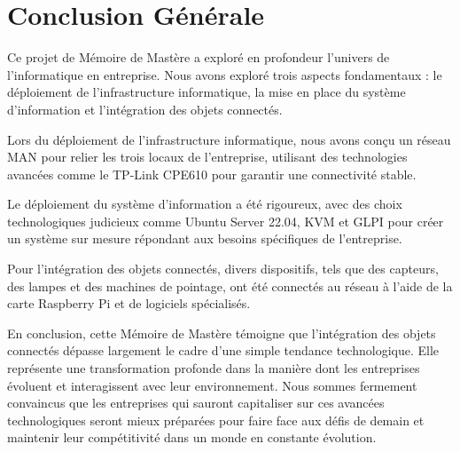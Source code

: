 \chapter*{Conclusion Générale}

Ce projet de Mémoire de Mastère a exploré en profondeur l'univers de l'informatique en entreprise. Nous avons exploré trois aspects fondamentaux : le déploiement de l'infrastructure informatique, la mise en place du système d'information et l'intégration des objets connectés.

Lors du déploiement de l'infrastructure informatique, nous avons conçu un réseau MAN pour relier les trois locaux de l'entreprise, utilisant des technologies avancées comme le TP-Link CPE610 pour garantir une connectivité stable.

Le déploiement du système d'information a été rigoureux, avec des choix technologiques judicieux comme Ubuntu Server 22.04, KVM et GLPI pour créer un système sur mesure répondant aux besoins spécifiques de l'entreprise.

Pour l'intégration des objets connectés, divers dispositifs, tels que des capteurs, des lampes et des machines de pointage, ont été connectés au réseau à l'aide de la carte Raspberry Pi et de logiciels spécialisés.

En conclusion, cette Mémoire de Mastère témoigne que l'intégration des objets connectés dépasse largement le cadre d'une simple tendance technologique. Elle représente une transformation profonde dans la manière dont les entreprises évoluent et interagissent avec leur environnement. Nous sommes fermement convaincus que les entreprises qui sauront capitaliser sur ces avancées technologiques seront mieux préparées pour faire face aux défis de demain et maintenir leur compétitivité dans un monde en constante évolution.




